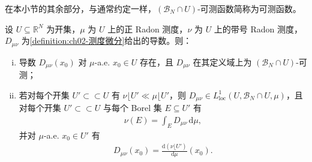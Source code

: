\documentclass[../../main.tex]{subfiles}%
\begin{document}
在本小节的其余部分，与通常约定一样，$(\mathscr B_N\cap U)$-可测函数简称为可测函数。

\begin{theorem}\label{theorem:ch02-Radon测度微分}\label{theorem:ch02-Lebesgue微分}
设 $U\subseteq\mathbb R^N$ 为开集，$\mu$ 为 $U$ 上的正 Radon 测度，$\nu$ 为 $U$ 上的带号 Radon 测度，$D_{\mu\nu}$ 为\cref{definition:ch02-测度微分}给出的导数。则：
\begin{enumerate}[(i)]
\item 导数 $D_{\mu\nu}(x_0)$ 对 $\mu$-a.e. $x_0\in U$ 存在，且 $D_{\mu\nu}$ 在其定义域上为 $(\mathscr B_N\cap U)$-可测；
\item 若对每个开集 $U'\subset\subset U$ 有 $\nu\lfloor U'\ll\mu\lfloor U'$，则 $D_{\mu\nu}\in L^1_{\mathrm{loc}}(U,\mathscr B_N\cap U,\mu)$，且对每个开集 $U'\subset\subset U$ 与每个 Borel 集 $E\subseteq U'$ 有
\begin{align}
\nu(E)=\int_ED_{\mu\nu}\,\mathrm{d}\mu, \label{align:ch02-2.87}
\end{align}
并对 $\mu$-a.e. $x_0\in U'$ 有
\begin{align}
D_{\mu\nu}(x_0)=\frac{\mathrm{d}(\nu\lfloor U')}{\mathrm{d}\mu}(x_0). \label{align:ch02-2.88}
\end{align}
\end{enumerate}
\end{theorem}
\end{document}
